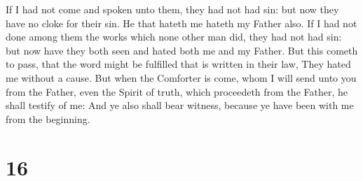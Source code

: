  If I had not come and spoken unto them, they had not had
sin: but now they have no cloke for their sin.  He that
hateth me hateth my Father also.  If I had not done among
them the works which none other man did, they had not had sin: but now
have they both seen and hated both me and my Father.  But
this cometh to pass, that the word might be fulfilled that is written in
their law, They hated me without a cause.  But when the
Comforter is come, whom I will send unto you from the Father, even the
Spirit of truth, which proceedeth from the Father, he shall testify of
me:  And ye also shall bear witness, because ye have been
with me from the beginning.

\hypertarget{section-15}{%
\section{16}\label{section-15}}


